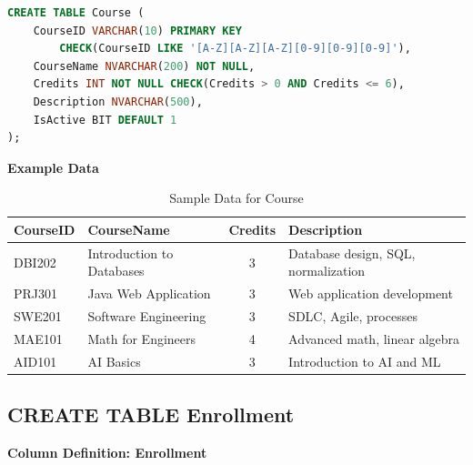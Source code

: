 \documentclass[12pt,a4paper]{report}
\begin{document}
\vspace{0.3cm}

\begin{lstlisting}[language=SQL, caption=Create Table Course]
CREATE TABLE Course (
    CourseID VARCHAR(10) PRIMARY KEY 
        CHECK(CourseID LIKE '[A-Z][A-Z][A-Z][0-9][0-9][0-9]'),
    CourseName NVARCHAR(200) NOT NULL,
    Credits INT NOT NULL CHECK(Credits > 0 AND Credits <= 6),
    Description NVARCHAR(500),
    IsActive BIT DEFAULT 1
);
\end{lstlisting}

\textbf{Example Data}

\begin{table}[ht]
\centering
\small
\begin{tabular}{|l|l|c|p{5cm}|}
\hline
\textbf{CourseID} & \textbf{CourseName} & \textbf{Credits} & \textbf{Description} \\ \hline
DBI202 & Introduction to Databases & 3 & Database design, SQL, normalization \\ \hline
PRJ301 & Java Web Application & 3 & Web application development \\ \hline
SWE201 & Software Engineering & 3 & SDLC, Agile, processes \\ \hline
MAE101 & Math for Engineers & 4 & Advanced math, linear algebra \\ \hline
AID101 & AI Basics & 3 & Introduction to AI and ML \\ \hline
\end{tabular}
\caption{Sample Data for Course}
\label{tab:course_data}
\end{table}

\vspace{8cm}

\subsection{CREATE TABLE Enrollment}

\textbf{Column Definition: Enrollment}
\end{document}
